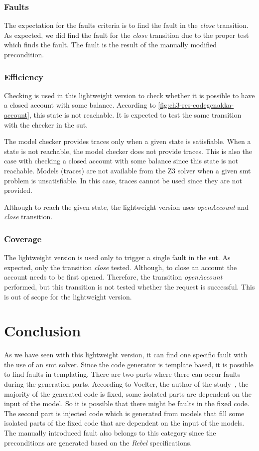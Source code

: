 \subsubsection{Faults}
The expectation for the faults criteria is to find the fault in the
\textit{close} transition. As expected, we did find the fault for the \textit{close}
transition due to the proper test which finds the fault. The fault is the result
of the manually modified precondition.

\subsubsection{Efficiency}

Checking is used in this lightweight version to check whether it is possible
to have a closed account with some balance. According to
\autoref{fig:ch3-res-codegenakka-account}, this state is not reachable. It is
expected to test the same transition with the checker in the \gls{sut}.

The model checker provides traces only when a given state is satisfiable.
When a state is not reachable, the model checker does not provide traces.
This is also the case with checking a closed account with some balance since
this state is not reachable. Models (traces) are not available from the Z3
solver when a given \gls{smt} problem is unsatisfiable. In this case, traces
cannot be used since they are not provided.

Although to reach the given state, the lightweight version uses
\textit{openAccount} and \textit{close} transition.

\subsubsection{Coverage}
The lightweight version is used only to trigger a single fault in the \gls{sut}. As
expected, only the transition \textit{close} tested. Although, to close an
account the account needs to be first opened. Therefore, the transition
\textit{openAccount} performed, but this transition is not tested whether the
request is successful. This is out of scope for the lightweight version.

\section{Conclusion}

As we have seen with this lightweight version, it can find one specific fault
with the use of an \gls{smt} solver. Since the code generator is template based,
it is possible to find faults in templating. There are two parts where there can
occur faults during the generation parts.
According to Voelter, the author of the study~\cite{voelter2013dsl},
the majority of the generated code is fixed, some isolated parts are dependent
on the input of the model. So it is possible that there might be faults in the
fixed code. The second part is injected code which is generated from models that
fill some isolated parts of the fixed code that are dependent on the input of
the models. The manually introduced fault also belongs to this category since
the preconditions are generated based on the \textit{Rebel} specifications.
